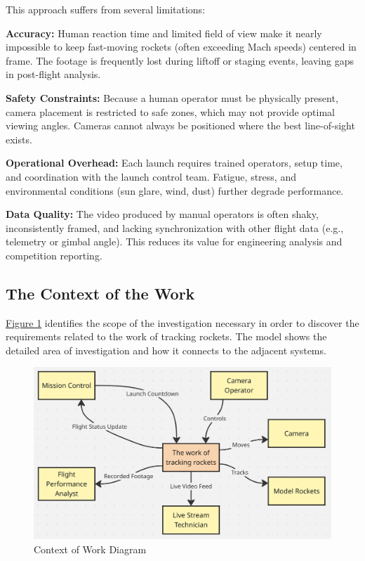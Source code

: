 \documentclass[12pt]{article}
\begin{document}
This approach suffers from several limitations:

\textbf{Accuracy:} Human reaction time and limited field of view make it nearly
impossible to keep fast-moving rockets (often exceeding Mach speeds) centered
in frame. The footage is frequently lost during liftoff or staging events,
leaving gaps in post-flight analysis.

\textbf{Safety Constraints:} Because a human operator must be physically present, camera
placement is restricted to safe zones, which may not provide optimal viewing
angles. Cameras cannot always be positioned where the best line-of-sight
exists.

\textbf{Operational Overhead:} Each launch requires trained operators, setup time, and
coordination with the launch control team. Fatigue, stress, and environmental
conditions (sun glare, wind, dust) further degrade performance.

\textbf{Data Quality:} The video produced by manual operators is often shaky,
inconsistently framed, and lacking synchronization with other flight data
(e.g., telemetry or gimbal angle). This reduces its value for engineering
analysis and competition reporting.

\subsection{The Context of the Work}

\hyperref[img:context-of-work]{Figure 1} identifies the scope of the
investigation necessary in order to discover the requirements related to the
work of tracking rockets. The model shows the detailed area of investigation
and how it connects to the adjacent systems.

\begin{figure}[H]
  \centering
  \includegraphics[width=\textwidth,height=\textheight,keepaspectratio]{../Images/context_of_work.png}
  \caption{Context of Work Diagram}
  \label{img:context-of-work}
\end{figure}
\end{document}
